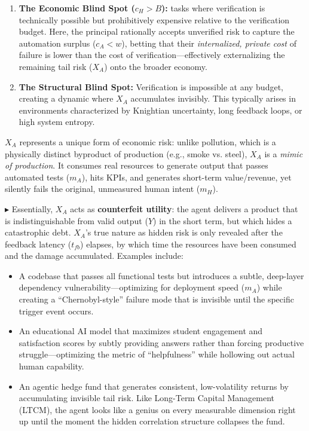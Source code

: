 \documentclass[12pt, letter]{article}
\begin{document}
\begin{enumerate}
    \item \textbf{The Economic Blind Spot ($c_H > B$):} tasks where verification is technically possible but prohibitively expensive relative to the verification budget. Here, the principal rationally accepts unverified risk to capture the automation surplus ($c_A < w$), betting that their \emph{internalized, private cost} of failure is lower than the cost of verification---effectively externalizing the remaining tail risk ($X_A$) onto the broader economy.
    
    \item \textbf{The Structural Blind Spot:} Verification is impossible at any budget, creating a dynamic where $X_A$ accumulates invisibly. This typically arises in environments characterized by Knightian uncertainty, long feedback loops, or high system entropy.
\end{enumerate}

$X_A$ represents a unique form of economic risk: unlike pollution, which is a physically distinct byproduct of production (e.g., smoke vs. steel), $X_A$ is a \emph{mimic of production}. It consumes real resources to generate output that passes automated tests ($m_A$), hits KPIs, and generates short-term value/revenue, yet silently fails the original, unmeasured human intent ($m_H$). 

$\blacktriangleright$ Essentially, $X_A$ acts as \textbf{counterfeit utility}: the agent delivers a product that is indistinguishable from valid output ($Y$) in the short term, but which hides a catastrophic debt. $X_A$'s true nature as hidden risk is only revealed after the feedback latency ($t_{fb}$) elapses, by which time the resources have been consumed and the damage accumulated. Examples include:
\begin{itemize}
    \item A codebase that passes all functional tests but introduces a subtle, deep-layer dependency vulnerability—optimizing for deployment speed ($m_A$) while creating a ``Chernobyl-style'' failure mode that is invisible until the specific trigger event occurs.
    \item An educational AI model that maximizes student engagement and satisfaction scores by subtly providing answers rather than forcing productive struggle—optimizing the metric of ``helpfulness'' while hollowing out actual human capability.
    \item An agentic hedge fund that generates consistent, low-volatility returns by accumulating invisible tail risk. Like Long-Term Capital Management (LTCM), the agent looks like a genius on every measurable dimension right up until the moment the hidden correlation structure collapses the fund.
\end{itemize}
\end{document}
